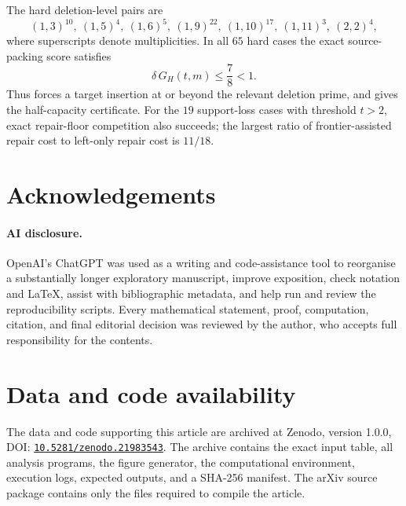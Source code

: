 \documentclass[11pt]{article}
\numberwithin{equation}{section}
\theoremstyle{blueplain}
\theoremstyle{bluedef}
\newcommand{\zenododoi}{\href{https://doi.org/10.5281/zenodo.21983543}{\nolinkurl{10.5281/zenodo.21983543}}}
\begin{document}
The hard deletion-level pairs are
\begin{equation}
 (1,3)^{10},\ (1,5)^4,\ (1,6)^5,\ (1,9)^{22},\
 (1,10)^{17},\ (1,11)^3,\ (2,2)^4,
 \label{eq:hard-pattern-counts}
\end{equation}
where superscripts denote multiplicities.  In all $65$ hard cases the exact source-packing score satisfies
\begin{equation}
 \delta\,G_H(t,m)\le\frac78<1.
 \label{eq:finite-packing-max}
\end{equation}
Thus  forces a target insertion at or beyond the relevant deletion prime, and  gives the half-capacity certificate.  For the $19$ support-loss cases with threshold $t>2$, exact repair-floor competition also succeeds; the largest ratio of frontier-assisted repair cost to left-only repair cost is $11/18$.


\section*{Acknowledgements}
\paragraph{AI disclosure.}
OpenAI's ChatGPT was used as a writing and code-assistance tool to reorganise a substantially longer exploratory manuscript, improve exposition, check notation and LaTeX, assist with bibliographic metadata, and help run and review the reproducibility scripts.  Every mathematical statement, proof, computation, citation, and final editorial decision was reviewed by the author, who accepts full responsibility for the contents.

\section*{Data and code availability}
 The data and code supporting this article are archived at Zenodo, version 1.0.0, DOI: \zenododoi.  The archive contains the exact input table, all analysis programs, the figure generator, the computational environment, execution logs, expected outputs, and a SHA-256 manifest.  The arXiv source package contains only the files required to compile the article.

\begingroup
\small
\setlength{\bibsep}{0.35em}


\endgroup
\end{document}
